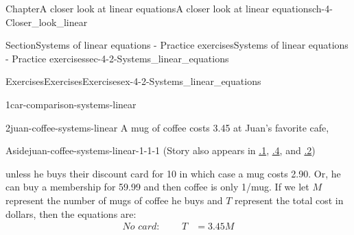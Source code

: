 \documentclass[twoside,11pt,]{book}
\newcommand{\xreffont}{\relax}
\newcommand{\terminology}[1]{\textbf{#1}}
\newlength{\fillinmaxwidth}
\newlength{\fillincontract}
\newlength{\charmaxwidth}\setlength{\charmaxwidth}{0.5em}
\newlength{\charminwidth}\setlength{\charminwidth}{0.1em}
\newlength{\fillinheight}
\newcommand{\fillintext}[1]{%
\setlength{\fillinmaxwidth}{#1\charmaxwidth}%
\setlength{\fillincontract}{#1\charminwidth}%
\setlength{\fillinheight}{\baselineskip}\addtolength{\fillinheight}{1.2pt}%
\strut\nobreak\leaders\vbox{\hrule width 0.3pt height 0.3pt \vskip -1.2pt}\hskip 1\fillinmaxwidth minus \fillincontract\nobreak\strut%
}
\newlength{\workspacestrutwidth}
\numberwithin{equation}{section}
\newcommand{\amp}{&}
\begin{document}
\begin{chapterptx}{Chapter}{A closer look at linear equations}{}{A closer look at linear equations}{}{}{ch-4-Closer_look_linear}
\begin{sectionptx}{Section}{Systems of linear equations - Practice exercises}{}{Systems of linear equations - Practice exercises}{}{}{sec-4-2-Systems_linear_equations}
\begin{exercises-subsection-numberless}{Exercises}{Exercises}{}{Exercises}{}{}{ex-4-2-Systems_linear_equations}
\begin{divisionexercise}{1}{}{}{car-comparison-systems-linear}
%
\end{divisionexercise}%
\clearpage
\begin{divisionexercise}{2}{}{}{juan-coffee-systems-linear}%
A mug of coffee costs \textdollar{}3.45 at Juan's favorite cafe, \begin{aside}{Aside}{}{juan-coffee-systems-linear-1-1-1}%
(Story also appears in \hyperlink{juan-coffee-order-operations}{{\xreffont 0.4.1}}, \hyperlink{juan-coffee-tables-graphs}{{\xreffont 1.2.4}}, and \hyperlink{juan-coffee-systems-linear}{{\xreffont 4.2.2}})%
\end{aside}
 unless he buys their discount card for \textdollar{}10 in which case a mug costs \textdollar{}2.90. Or, he can buy a membership for \textdollar{}59.99 and then coffee is only \textdollar{}1\slash{}mug. If we let \(M\) represent the number of mugs of coffee he buys and \(T\) represent the total cost in dollars, then the equations are:%
\begin{align*}
\textit{No card: } \qquad  
T \amp= 3.45M\\

\end{align*}
\end{divisionexercise}
\end{exercises-subsection-numberless}
\end{sectionptx}
\end{chapterptx}
\end{document}
